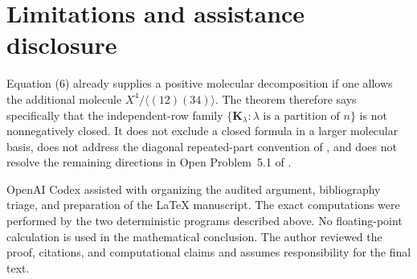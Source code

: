 \documentclass[11pt]{article}
\begin{document}
\section{Limitations and assistance disclosure}

Equation (6) already supplies a positive molecular decomposition if one
allows the additional molecule $X^4/\langle(12)(34)\rangle$.  The theorem
therefore says specifically that the independent-row family
$\{\mathbf{K}_\lambda:\lambda\text{ is a partition of }n\}$ is not nonnegatively closed.  It does not
exclude a closed formula in a larger molecular basis, does not address the
diagonal repeated-part convention of \cite{BaolahyBenjamin2026}, and does
not resolve the remaining directions in Open Problem~5.1 of
\cite{BaolahyRandrianirina2026}.

OpenAI Codex assisted with organizing the audited argument, bibliography
triage, and preparation of the \LaTeX{} manuscript.  The exact computations
were performed by the two deterministic programs described above.  No
floating-point calculation is used in the mathematical conclusion.  The
author reviewed the proof, citations, and computational claims and assumes
responsibility for the final text.



\end{document}
